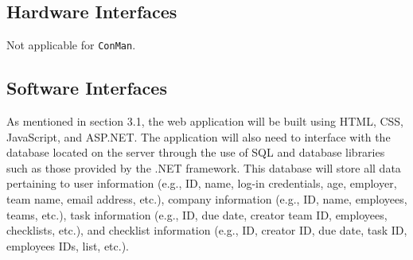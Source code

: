 \documentclass{article}
\begin{document}
\subsection{Hardware Interfaces}
Not applicable for \texttt{ConMan}.

\subsection{Software Interfaces}

As mentioned in section 3.1, the web application will be built using HTML, CSS, JavaScript, and ASP.NET. 
The application will also need to interface with the database located on the server through the use of SQL and database libraries such as those provided by the .NET framework. 
This database will store all data pertaining to user information (e.g., ID, name, log-in credentials, age, employer, team name, email address, etc.), company information (e.g., ID, name, employees, teams, etc.), task information (e.g., ID, due date, creator team ID, employees, checklists, etc.), and checklist information (e.g., ID, creator ID, due date, task ID, employees IDs, list, etc.).
        
\end{document}
